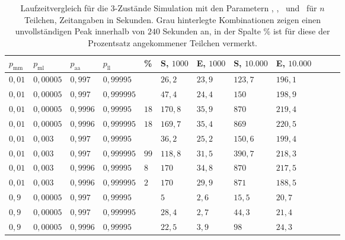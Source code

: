 \begin{table}[h]
\centering 
\caption[Laufzeitvergleich für die 3-Zustände Simulation]{Laufzeitvergleich für die 3-Zustände Simulation mit den Parametern \pmm, \pml, \paa\ und \pll\ für $n$ Teilchen, Zeitangaben in Sekunden. Grau hinterlegte Kombinationen zeigen einen unvollständigen Peak innerhalb von $240$ Sekunden an, in der Spalte \% ist für diese der Prozentsatz angekommener Teilchen vermerkt.}
\label{3s_laufzeit}
\begin{tabular}{|l|l|l|l||l||l|l|l|l|l|l|l|}
\hline
$p_\text{mm}$ & $p_\text{ml}$ & $p_\text{aa}$ & $p_\text{ll}$ & \%& S, $1000$ & E, $1000$ & S, $10.000$ & E, $10.000$ \\ \hline \hline
$ 0,01 $ & $0,00005$ & $0,997$  & $0,99995$  && $26,2   $ & $23,9  $ & $123,7 $ & $196,1 $  \\ \hline
$ 0,01 $ & $0,00005$ & $0,997$  & $0,999995$ && $47,4   $ & $24,4  $ & $150   $ & $198,9 $  \\ \hline
\cellcolor{gray!25}$ 0,01 $ & \cellcolor{gray!25}$0,00005$ &\cellcolor{gray!25} $0,9996$ &\cellcolor{gray!25} $0,99995$  &$18$& $170,8 $ & $35,9  $ & $870   $ & $219,4 $  \\ \hline
\cellcolor{gray!25}$ 0,01 $ & \cellcolor{gray!25}$0,00005$ &\cellcolor{gray!25} $0,9996$ & \cellcolor{gray!25}$0,999995$ &$18$& $169,7 $ & $35,4  $ & $869   $ & $220,5 $  \\ \hline
$ 0,01 $ & $0,003 $  & $0,997$  & $0,99995$  && $36,2   $ & $25,2  $ & $150,6 $ & $199,4 $  \\ \hline
\cellcolor{gray!25}$ 0,01 $ & \cellcolor{gray!25}$0,003 $  & \cellcolor{gray!25}$0,997$  & \cellcolor{gray!25}$0,999995$ &$99$& $118,8$ & $31,5  $ & $390,7 $ & $218,3 $  \\ \hline
\cellcolor{gray!25}$ 0,01 $ & \cellcolor{gray!25}$0,003 $  & \cellcolor{gray!25}$0,9996$ & \cellcolor{gray!25}$0,99995$  &$8$& $170   $ & $34,8  $ & $870   $ & $217,5 $  \\ \hline
\cellcolor{gray!25}$ 0,01 $ & \cellcolor{gray!25}$0,003 $  & \cellcolor{gray!25}$0,9996$ & \cellcolor{gray!25}$0,999995$ &$2$& $170   $ & $29,9  $ & $871   $ & $188,5 $  \\ \hline
$ 0,9  $ & $0,00005$ & $0,997$  & $0,99995$  && $5      $ & $2,6 $   & $15,5  $ & $20,7 $  \\ \hline
$ 0,9  $ & $0,00005$ & $0,997$  & $0,999995$ && $28,4   $ & $2,7 $   & $44,3  $ & $21,4 $  \\ \hline
$ 0,9  $ & $0,00005$ & $0,9996$ & $0,99995$  && $22,5   $ & $3,9 $   & $98    $ & $24,3 $  \\ \hline

\end{tabular}
\end{table}
